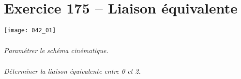 \section*{Exercice 175 -- Liaison équivalente}
\setcounter{exo}{0}
\ifprof
\else

\begin{center}
\texttt{[image: 042\_01]}
\end{center}

\subparagraph{}
\textit{Paramétrer le schéma cinématique.}


\subparagraph{}
\textit{Déterminer la liaison équivalente entre 0 et 2.}


